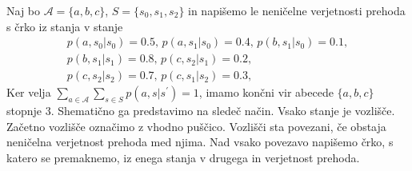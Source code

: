 \documentclass[fin1, tisk]{fmfdelo}
\newcommand{\A}{\mathcal{A}}
\theoremstyle{definition}
\begin{document}
\begin{primer}
    Naj bo $\A = \{ a, b, c \}$, $S = \{ s_0, s_1, s_2 \}$ in napišemo le neničelne 
    verjetnosti prehoda s črko iz stanja v stanje
    \begin{gather*}
        p(a, s_0|s_0) = 0.5, \, p(a, s_1|s_0) = 0.4, \, p(b, s_1|s_0) = 0.1, \\
        p(b, s_1|s_1) = 0.8, \, p(c, s_2|s_1) = 0.2, \\
        p(c, s_2|s_2) = 0.7, \, p(c, s_1|s_2) = 0.3,
    \end{gather*}
    Ker velja $\sum_{a \in \A} \sum_{s \in S} p(a, s|s^\prime) = 1$,  imamo končni vir abecede 
    $\{ a, b, c \}$ stopnje $3$. Shematično ga predstavimo na sledeč način. Vsako stanje je 
    vozlišče. Začetno vozlišče označimo z vhodno puščico. Vozlišči sta povezani, če obstaja 
    neničelna verjetnost prehoda med njima. Nad vsako povezavo napišemo črko, s katero se 
    premaknemo, iz enega stanja v drugega in verjetnost prehoda.
    \begin{figure}[H] 
        \centering 
\end{figure}
\end{primer}
\end{document}
